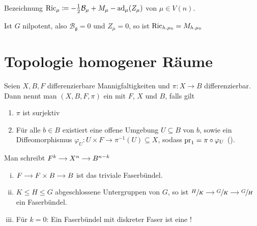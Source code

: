 Bezeichnung $\operatorname{Ric}_\mu \coloneqq -\frac{1}{2} \mathcal{B}_\mu + M_\mu - \operatorname{ad}_\mu(Z_\mu)$  von $\mu \in V(n)$.

\begin{bemerkung*}[{name=[Ricci-Endomorphismus für nilpotente Liegruppe]}]
	Ist $G$ nilpotent, also $\mathcal{B}_\mathfrak{g} =0$ und $Z_\mu =0$, so ist $\operatorname{Ric}_{h.\mu_0}=M_{h.\mu_0}$
\end{bemerkung*}

\newpage
\section{Topologie homogener Räume} %
\label{sec:33}

\begin{definition}[{name=[Faserbündel]}]
	Seien $X,B,F$ differenzierbare Mannigfaltigkeiten und $\pi \colon X \to B$ differenzierbar.
	Dann nennt man $(X,B,F,\pi)$ ein  mit   $F$,  $X$  und  $B$, falls gilt 
	\begin{enumerate}[1)]
		\item $\pi$ ist surjektiv
		\item Für alle $b \in B$ existiert eine offene Umgebung $U \subseteq B$ von $b$, sowie ein Diffeomorphismus $\varphi_U \colon U \times F \to \pi^{-1}(U) \subseteq X$, sodass $\operatorname{pr}_1 = \pi \circ \varphi_U$ ().
	\end{enumerate}
	Man schreibt 
	\(
		\begin{tikzcd}[cramped,sep=small]
			F^k \rar & X^n \rar & B^{n-k}
		\end{tikzcd}
	\)
\end{definition}

\begin{beispiel*}[{name=[einfache Faserbündel]}]
	\begin{enumerate}[(i)]
		\item \(
			\begin{tikzcd}[cramped,sep=small]
				F \rar & F \times B \rar & B
			\end{tikzcd} 
		\)
		ist das triviale Faserbündel.
		\item $K \le H \le G$ abgeschlossene Untergruppen von $G$, so ist 
		\(
			\begin{tikzcd}[cramped,sep=small]
				\sfrac{H}{K} \rar & \sfrac{G}{K} \rar & \sfrac{G}{H}
			\end{tikzcd}
		\)
		ein Faserbündel.
		\item Für $k=0$: Ein Faserbündel mit diskreter Faser ist eine !
	\end{enumerate}
\end{beispiel*}

